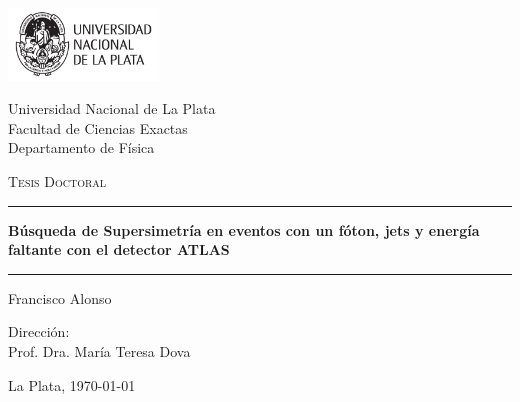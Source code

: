 \newcommand{\HRule}{\rule{\linewidth}{1pt}}

\begin{titlepage}
  \begin{center}

    \includegraphics[width=0.30\textwidth]{figures/logo_unlp.pdf}

    \vspace{0.5cm}

    {
      \large
      Universidad Nacional de La Plata \\
      Facultad de Ciencias Exactas \\
      Departamento de F\'isica
    }

    \vspace{1.5cm}


    \textsc{\Large Tesis Doctoral}\\[0.5cm]

    \HRule

    \vspace{0.4cm}

    {
      \huge \bfseries B\'usqueda de Supersimetr\'ia en eventos con un f\'oton,
      jets y energ\'ia faltante con el detector ATLAS\\[0.4cm]
    }

    \HRule

    \vspace{1.5cm}

    \noindent
    Francisco Alonso

    \vspace{1cm}

    Direcci\'on: \\
    Prof. Dra. Mar\'ia Teresa Dova

    \vfill

    {\large La Plata, \today}

  \end{center}
\end{titlepage}
